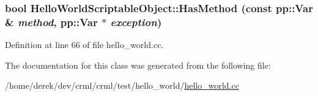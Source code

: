 \hypertarget{class_hello_world_scriptable_object_a0af23165c74483e47f97877cbb51e79a}{
\subsubsection[{HasMethod}]{\setlength{\rightskip}{0pt plus 5cm}bool HelloWorldScriptableObject::HasMethod (const pp::Var \& {\em method}, \/  pp::Var $\ast$ {\em exception})}}
\label{class_hello_world_scriptable_object_a0af23165c74483e47f97877cbb51e79a}


Definition at line 66 of file hello\_\-world.cc.



The documentation for this class was generated from the following file:\begin{DoxyCompactItemize}
\item 
/home/derek/dev/crml/crml/test/hello\_\-world/\hyperlink{hello__world_8cc}{hello\_\-world.cc}\end{DoxyCompactItemize}
